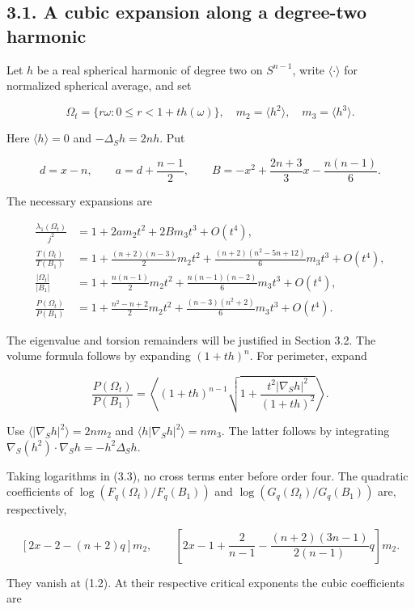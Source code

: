 \documentclass[11pt]{article}
\begin{document}
\subsection{3.1. A cubic expansion along a degree-two
harmonic}\label{a-cubic-expansion-along-a-degree-two-harmonic}

Let \(h\) be a real spherical harmonic of degree two on \(S^{n-1}\),
write \(\langle\cdot\rangle\) for normalized spherical average, and set

\[
\Omega_t=\{r\omega:0\le r<1+t h(\omega)\},\quad
m_2=\langle h^2\rangle,\quad m_3=\langle h^3\rangle.
\tag{3.1}
\]

Here \(\langle h\rangle=0\) and \(-\Delta_S h=2nh\). Put

\[
d=x-n,\qquad a=d+\frac{n-1}{2},\qquad
B=-x^2+\frac{2n+3}{3}x-\frac{n(n-1)}6.
\tag{3.2}
\]

The necessary expansions are

\[
\begin{aligned}
\frac{\lambda_1(\Omega_t)}{j^2}
 &=1+2a m_2t^2+2B m_3t^3+O(t^4),\\
\frac{T(\Omega_t)}{T(B_1)}
 &=1+\frac{(n+2)(n-3)}2m_2t^2
+\frac{(n+2)(n^2-5n+12)}6m_3t^3+O(t^4),\\
\frac{|\Omega_t|}{|B_1|}
 &=1+\frac{n(n-1)}2m_2t^2+\frac{n(n-1)(n-2)}6m_3t^3+O(t^4),\\
\frac{P(\Omega_t)}{P(B_1)}
 &=1+\frac{n^2-n+2}{2}m_2t^2
+\frac{(n-3)(n^2+2)}6m_3t^3+O(t^4).
\end{aligned}
\tag{3.3}
\]

The eigenvalue and torsion remainders will be justified in Section 3.2.
The volume formula follows by expanding \((1+th)^n\). For perimeter,
expand

\[
\frac{P(\Omega_t)}{P(B_1)}
=\left\langle(1+th)^{n-1}
\sqrt{1+\frac{t^2|\nabla_Sh|^2}{(1+th)^2}}\right\rangle.
\tag{3.4}
\]

Use \(\langle|\nabla_Sh|^2\rangle=2nm_2\) and
\(\langle h|\nabla_Sh|^2\rangle=nm_3\). The latter follows by
integrating \(\nabla_S(h^2)\cdot\nabla_Sh=-h^2\Delta_Sh\).

Taking logarithms in (3.3), no cross terms enter before order four. The
quadratic coefficients of \(\log(F_q(\Omega_t)/F_q(B_1))\) and
\(\log(G_q(\Omega_t)/G_q(B_1))\) are, respectively,

\[
[2x-2-(n+2)q]m_2,
\qquad
\left[2x-1+\frac2{n-1}
-\frac{(n+2)(3n-1)}{2(n-1)}q\right]m_2.
\tag{3.5}
\]

They vanish at (1.2). At their respective critical exponents the cubic
coefficients are
\end{document}
